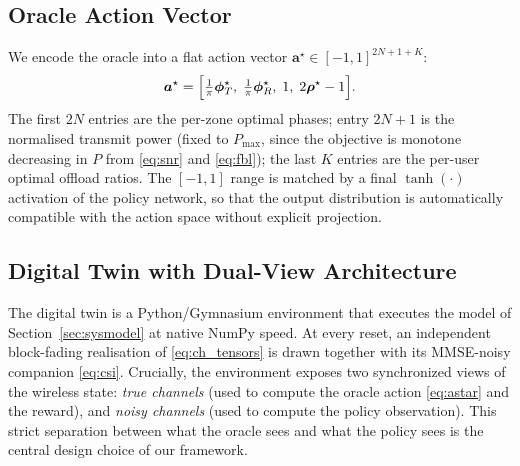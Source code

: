 \documentclass[journal]{IEEEtran}
\newcommand{\vect}[1]{\bm{#1}}
\begin{document}
\subsection{Oracle Action Vector}

We encode the oracle into a flat action vector
$\vect{a}^{\star}\!\in\![-1,1]^{2N+1+K}$:
\begin{equation}
  \vect{a}^{\star}=
  \Bigl[\tfrac{1}{\pi}\vect{\phi}_T^{\star},\;
        \tfrac{1}{\pi}\vect{\phi}_R^{\star},\;
        1,\;
        2\vect{\rho}^{\star}-1\Bigr].
  \label{eq:astar}
\end{equation}
The first $2N$ entries are the per-zone optimal phases; entry
$2N\!+\!1$ is the normalised transmit power (fixed to $P_{\max}$,
since the objective is monotone decreasing in $P$
from \eqref{eq:snr} and \eqref{eq:fbl}); the last $K$ entries are the
per-user optimal offload ratios. The $[-1,1]$ range is matched by a
final $\tanh(\cdot)$ activation of the policy network, so that the
output distribution is automatically compatible with the action
space without explicit projection.

\subsection{Digital Twin with Dual-View Architecture}

The digital twin is a Python/Gymnasium environment that executes the
model of Section~\ref{sec:sysmodel} at native NumPy speed. At every
reset, an independent block-fading realisation of
\eqref{eq:ch_tensors} is drawn together with its MMSE-noisy
companion \eqref{eq:csi}. Crucially, the environment exposes two
synchronized views of the wireless state: \emph{true channels} (used
to compute the oracle action \eqref{eq:astar} and the reward), and
\emph{noisy channels} (used to compute the policy observation).
This strict separation between what the oracle sees and what the
policy sees is the central design choice of our framework.
\end{document}
